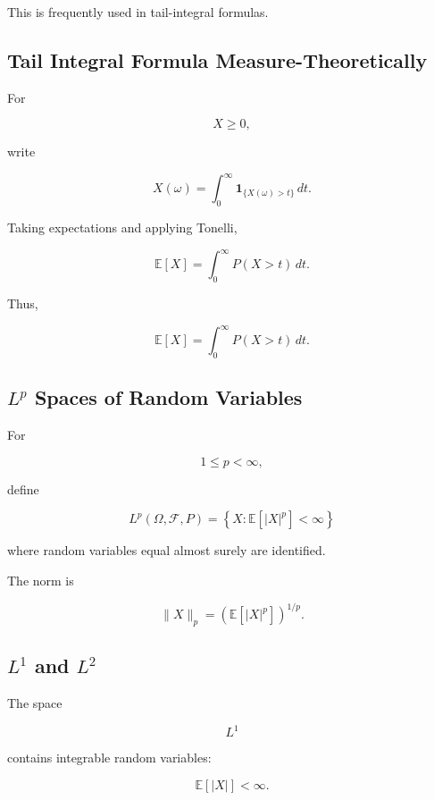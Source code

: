 This is frequently used in tail-integral formulas.

\subsection{Tail Integral Formula Measure-Theoretically}
\label{subsec:tail-integral-measure}

For

\[
X\geq0,
\]

write

\[
X(\omega)
=
\int_0^\infty
\mathbf{1}_{\{X(\omega)>t\}}
\,dt.
\]

Taking expectations and applying Tonelli,

\[
\mathbb{E}[X]
=
\int_0^\infty
P(X>t)\,dt.
\]

Thus,

\[
\boxed{
\mathbb{E}[X]
=
\int_0^\infty
P(X>t)\,dt.
}
\]

\subsection{\(L^p\) Spaces of Random Variables}
\label{subsec:lp-probability}

For

\[
1\leq p<\infty,
\]

define

\[
\boxed{
L^p(\Omega,\mathcal{F},P)
=
\left\{
X:
\mathbb{E}[|X|^p]<\infty
\right\}
}
\]

where random variables equal almost surely are identified.

The norm is

\[
\boxed{
\|X\|_p
=
\left(
\mathbb{E}[|X|^p]
\right)^{1/p}.
}
\]

\subsection{\(L^1\) and \(L^2\)}
\label{subsec:l1-l2-probability}

The space

\[
L^1
\]

contains integrable random variables:

\[
\boxed{
\mathbb{E}[|X|]<\infty.
}
\]

